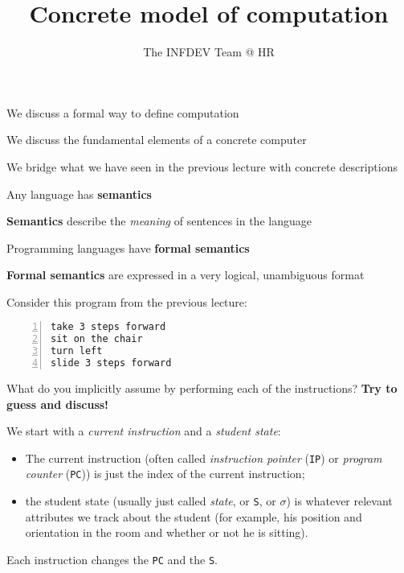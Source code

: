 \documentclass{beamer}
\title{Concrete model of computation}
\author{The INFDEV Team @ HR}
\institute{Hogeschool Rotterdam \\
Rotterdam, Netherlands}
\date{}
\begin{document}
\maketitle

\begin{slide}{
\item We discuss a formal way to define computation
\item We discuss the fundamental elements of a concrete computer
\item We bridge what we have seen in the previous lecture with concrete descriptions
}\end{slide}

\begin{slide}{
\item Any language has \textbf{semantics}
\item \textbf{Semantics} describe the \textit{meaning} of sentences in the language
\item Programming languages have \textbf{formal semantics}
\item \textbf{Formal semantics} are expressed in a very logical, unambiguous format
}\end{slide}

\begin{frame}[fragile]
Consider this program from the previous lecture:

\begin{lstlisting}[frame=shadowbox,numbers=left]
take 3 steps forward
sit on the chair
turn left
slide 3 steps forward
\end{lstlisting}

What do you implicitly assume by performing each of the instructions? \textbf{Try to guess and discuss!}
\end{frame}

\begin{slide}{
\item We start with a \textit{current instruction} and a \textit{student state}:
\begin{itemize}
\item The current instruction (often called \textit{instruction pointer} (\texttt{IP}) or \textit{program counter} (\texttt{PC})) is just the index of the current instruction;
\item the student state (usually just called \textit{state}, or \texttt{S}, or $\sigma$) is whatever relevant attributes we track about the student (for example, his position and orientation in the room and whether or not he is sitting).
\end{itemize}
\item Each instruction changes the \texttt{PC} and the \texttt{S}.
}\end{slide}
\end{document}
